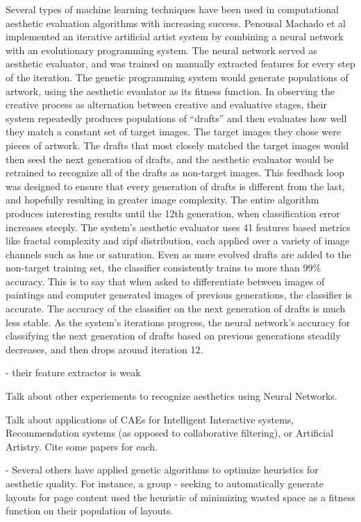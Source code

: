 \documentclass[midd]{thesis}
\begin{document}
Several types of machine learning techniques have been used in computational aesthetic evaluation algorithms with increasing success. Penousal Machado et al \cite{machado2008experiments} implemented an iterative artificial artist system by combining a neural network with an evolutionary programming system. The neural network served as aesthetic evaluator, and was trained on manually extracted features for every step of the iteration. The genetic programming system would generate populations of artwork, using the aesthetic evaulator as its fitness function. In observing the creative process as alternation between creative and evaluative stages, their system repeatedly produces populations of ``drafts'' and then evaluates how well they match a constant set of target images. The target images they chose were pieces of artwork. The drafts that most closely matched the target images would then seed the next generation of drafts, and the aesthetic evaluator would be retrained to recognize all of the drafts as non-target images. This feedback loop was designed to ensure that every generation of drafts is different from the last, and hopefully resulting in greater image complexity. The entire algorithm produces interesting results until the 12th generation, when classification error increases steeply. The system's aesthetic evaluator uses 41 features based metrics like fractal complexity and zipf distribution, each applied over a variety of image channels such as hue or saturation. Even as more evolved drafts are added to the non-target training set, the classifier consistently trains to more than 99\% accuracy. This is to say that when asked to differentiate between images of paintings and computer generated images of previous generations, the classifier is accurate. The accuracy of the classifier on the next generation of drafts is much less stable. As the system's iterations progress, the neural network's accuracy for classifying the next generation of drafts based on previous generations steadily decreases, and then drops around iteration 12.


- their feature extractor is weak

Talk about other experiements to recognize aesthetics using Neural Networks.

Talk about applications of CAEs for Intelligent Interactive systems, Recommendation systems (as opposed to collaborative filtering), or Artificial Artistry. Cite some papers for each.

- Several others have applied genetic algorithms to optimize heuristics for aesthetic quality. For instance, a group
- seeking to automatically generate layouts for page content used the heuristic of minimizing wasted space as a fitness function on their population of layouts.
\end{document}
